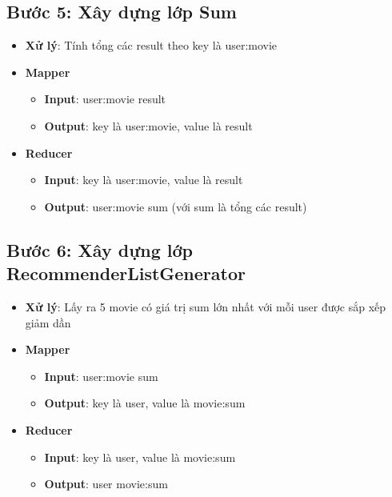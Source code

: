 \subsection*{Bước 5: Xây dựng lớp Sum}
\begin{itemize}
    \item \textbf{Xử lý}: Tính tổng các result theo key là user:movie
    \item \textbf{Mapper}
          \begin{itemize}
              \item \textbf{Input}: user:movie \quad result \\
              \item \textbf{Output}: key là user:movie, value là result \\
          \end{itemize}
    \item \textbf{Reducer}
          \begin{itemize}
              \item \textbf{Input}: key là user:movie, value là result \\
              \item \textbf{Output}: user:movie \quad sum (với sum là tổng các result) \\
          \end{itemize}
\end{itemize}
\subsection*{Bước 6: Xây dựng lớp RecommenderListGenerator}
\begin{itemize}
    \item \textbf{Xử lý}: Lấy ra 5 movie có giá trị sum lớn nhất với mỗi user được sắp xếp giảm dần
    \item \textbf{Mapper}
          \begin{itemize}
              \item \textbf{Input}: user:movie \quad sum \\
              \item \textbf{Output}: key là user, value là movie:sum \\
          \end{itemize}
    \item \textbf{Reducer}
          \begin{itemize}
              \item \textbf{Input}: key là user, value là movie:sum \\
              \item \textbf{Output}: user \quad movie:sum
          \end{itemize}
\end{itemize}

